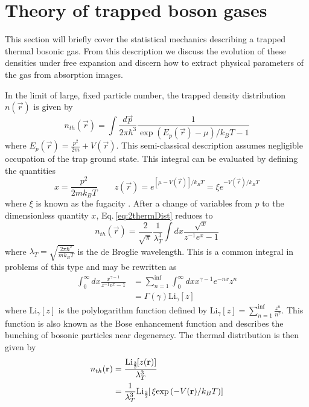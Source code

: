 \section{Theory of trapped boson gases} \label{sec:trapped_gases}
This section will briefly cover the statistical mechanics describing a trapped thermal bosonic gas.
From this description we discuss the evolution of these densities under free expansion and discern how to extract physical parameters of the gas from absorption images.

In the limit of large, fixed particle number, the trapped density distribution $n(\vec{r})$ is given by
\begin{equation} \label{eq:2thermDist}
	n_{th}(\vec{r}) = \int \frac{d\vec{p}}{2\pi\hbar^3} \frac{1}{\exp{(E_p(\vec{r}) - \mu)/k_BT} - 1}
\end{equation}
where $E_p(\vec{r}) = \frac{p^2}{2m} + V(\vec{r})$.
This semi-classical description assumes negligible occupation of the trap ground state.
This integral can be evaluated by defining the quantities
\begin{equation*}
	x = \frac{p^2}{2mk_BT} \quad\quad z(\vec{r}) = e^{[\mu - V(\vec{r})]/k_BT} = \xi e^{-V(\vec{r})/k_BT}
\end{equation*}
where $\xi$ is known as the fugacity \cite{psm02}.
After a change of variables from $p$ to the dimensionless quantity $x$, Eq.\,\ref{eq:2thermDist} reduces to
\begin{equation}
	n_{th}(\vec{r}) = \frac{2}{\sqrt{\pi}}\frac{1}{\lambda_T^3}\int dx \frac{\sqrt{x}}{z^{-1}e^x-1}
\end{equation}
where $\lambda_T = \sqrt{\frac{2 \pi \hbar^2}{m k_B T}}$ is the de Broglie wavelength.
This is a common integral in problems of this type and may be rewritten as \cite{Demarco1998, Ketterle1999, psm02}
\begin{equation}
\begin{split}
	\int_0^{\infty}dx\frac{x^{\gamma-1}}{z^{-1}e^x-1} &= \sum_{n=1}^{\inf}\int_0^{\infty}dx x^{\gamma-1}e^{-nx}z^n \\
	&=\Gamma(\gamma)\text{Li}_{\gamma}[z]
\end{split}
\end{equation}
where $\text{Li}_{\gamma}[z]$ is the polylogarithm function defined by $\text{Li}_{\gamma}[z] = \sum_{n=1}^{\inf}\frac{z^n}{n^{\gamma}}$.
This function is also known as the Bose enhancement function \cite{Ketterle1999} and describes the bunching of bosonic particles near degeneracy.
The thermal distribution is then given by
\begin{equation}
	\begin{split}
	n_{th}(\mathbf{r}) &= \frac{\text{Li}_{\scriptscriptstyle\frac{3}{2}\!}\!\left[ z(\mathbf{r}) \right]}{\lambda_T^3} \\
				 &= \frac{1}{\lambda_T^3}\text{Li}_{\scriptscriptstyle\frac{3}{2}\!}\!\left[ \,\xi \text{exp}\left( {-V(\mathbf{r})/k_BT} \right) \right]
	\end{split}
\end{equation}
